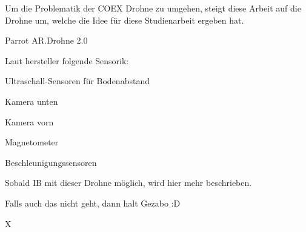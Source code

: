 
Um die Problematik der COEX Drohne zu umgehen, steigt diese Arbeit auf die Drohne um, welche die Idee für diese Studienarbeit ergeben hat.

Parrot AR.Drohne 2.0

Laut hersteller folgende Sensorik:

Ultraschall-Sensoren für Bodenabstand

Kamera unten

Kamera vorn


Magnetometer

Beschleunigungssensoren







Sobald IB mit dieser Drohne möglich, wird hier mehr beschrieben.

Falls auch das nicht geht, dann halt Gezabo :D









X






































